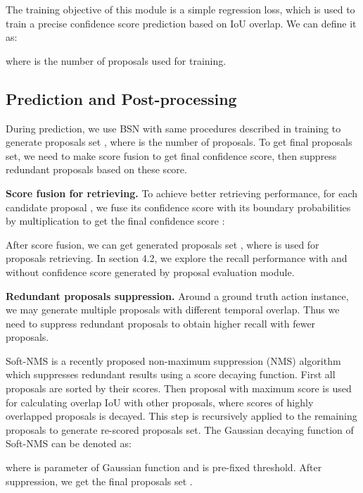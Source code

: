 \documentclass[runningheads]{llncs}
\begin{document}
The training objective of this module is a simple regression loss, which is used to train a precise confidence score prediction based on IoU overlap. We can define it as:

where  is the number of proposals used for training.

\subsection{Prediction and Post-processing}



During prediction, we use BSN with same procedures described in training to generate proposals set , where    is the number of proposals.
To get final proposals set, we need to make score fusion to get final confidence score, then suppress redundant proposals based on these score.  

\noindent
{\bf Score fusion for retrieving.} 
To achieve better retrieving performance, for each candidate proposal ,  we fuse its confidence score with its boundary probabilities by multiplication to get the final confidence score :



After score fusion, we can get generated proposals set , where  is used for proposals retrieving. In section 4.2, we explore the recall performance with and without confidence score generated by proposal evaluation module.


\noindent
{\bf Redundant proposals suppression.} 
Around a ground truth action instance, we may generate multiple proposals with different temporal overlap. Thus we need to suppress redundant proposals to obtain higher recall with fewer proposals.

Soft-NMS \cite{softNMS} is a recently proposed non-maximum suppression (NMS) algorithm which suppresses redundant results using a score decaying function. First all proposals are sorted by their scores. Then proposal  with maximum score is used for calculating overlap IoU with other proposals, where scores of highly overlapped proposals is decayed. This step is recursively applied to the remaining proposals to  generate re-scored proposals set. 
The Gaussian decaying function of Soft-NMS can be denoted  as:


\vspace{-0.05cm}

where  is parameter of Gaussian function and  is pre-fixed threshold. 
After suppression, we get the final proposals set .
\end{document}
